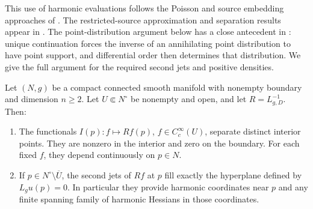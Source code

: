 This use of harmonic evaluations follows the Poisson and source
embedding approaches of \citet[Sections~2 and~6.1]{LLS20}.
The restricted-source approximation and separation results appear in
\citep[Appendix~A, Propositions~A.6--A.7]{LLS20}.
The point-distribution argument below has a close antecedent in
\citet[Chapter~III, Section~3, proof of Theorem~6]{Malgrange1956}:
unique continuation forces the inverse of an annihilating point
distribution to have point support, and differential order then
determines that distribution. We give the full argument for the
required second jets and positive densities.

\begin{lemma}\label{data:jet-family}
Let $(N,g)$ be a compact connected smooth manifold with nonempty
boundary and dimension $n\ge2$. Let $U\Subset N^\circ$ be
nonempty and open, and let $R=L_{g,D}^{-1}$. Then:
\begin{enumerate}[label=\textup{(\roman*)}]
 \item The functionals $I(p):f\mapsto Rf(p)$,
       $f\in C_c^\infty(U)$, separate distinct interior points.
       They are nonzero in the interior and zero on the boundary.
       For each fixed $f$, they depend continuously on $p\in N$.
 \item If $p\in N^\circ\setminus\overline U$, the second jets of
       $Rf$ at $p$ fill exactly the hyperplane defined by
       $L_g u(p)=0$. In particular they provide harmonic coordinates
       near $p$ and any finite spanning family of harmonic Hessians
       in those coordinates.
\end{enumerate}
\end{lemma}

